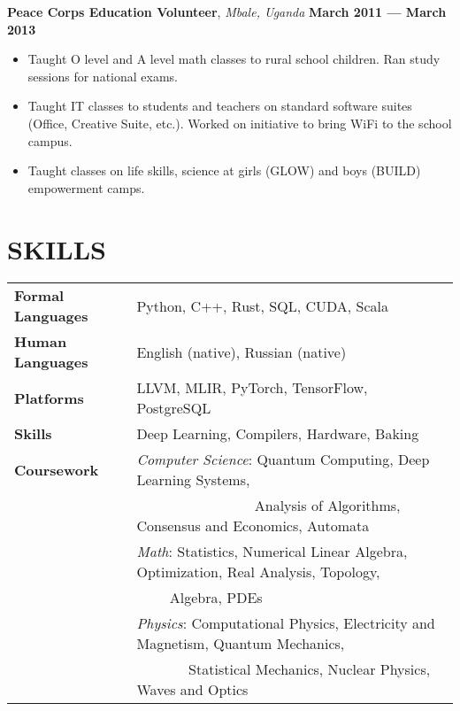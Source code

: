 \documentclass[11pt,letterpaper,roman,colorlinks,linkcolor=blue]{moderncv}
\newcommand*{\modern}{\fontfamily{qhv}\selectfont}
\newcommand{\mystyle}[1]{\textcolor{mygrey}{\modern #1}}
\newcommand{\mysectionstyle}[1]{\large\mystyle{#1}}
\begin{document}
\textbf{Peace Corps Education Volunteer}, \emph{Mbale, Uganda}
\hfill \textbf{March 2011 --- March 2013}
\begin{itemize}
\item Taught O level and A level math classes to rural school children. Ran study sessions for national exams.
\item Taught IT classes to students and teachers on standard software suites (Office, Creative Suite, etc.). Worked on initiative to bring WiFi to the school campus.
\item Taught classes on life skills, science at girls (GLOW) and boys (BUILD) empowerment camps.
\end{itemize}



\section{\mysectionstyle{SKILLS}}

\begin{tabular}{ @{} >{\bfseries}l @{\hspace{6ex}} l }
Formal Languages  & Python, C++, Rust, SQL, CUDA, Scala \\
Human Languages  & English (native), Russian (native) \\
Platforms  & LLVM, MLIR, PyTorch, TensorFlow, PostgreSQL \\
Skills     & Deep Learning, Compilers, Hardware, Baking \\
Coursework & \textit{Computer Science}: Quantum Computing, Deep Learning Systems, \\
	   & $\qquad$ $\qquad$ $\qquad$ $\quad$ Analysis of Algorithms, Consensus and Economics, Automata \\
           & \textit{Math}: Statistics, Numerical Linear Algebra, Optimization, Real Analysis, Topology, \\
           & $\qquad$ \hspace{0.5ex} Algebra, PDEs  \\
           & \textit{Physics}: Computational Physics, Electricity and Magnetism, Quantum Mechanics, \\ 
           & $\qquad$ $\quad$ \hspace{0.00ex} Statistical Mechanics, Nuclear Physics, Waves and Optics
\end{tabular}
\end{document}
